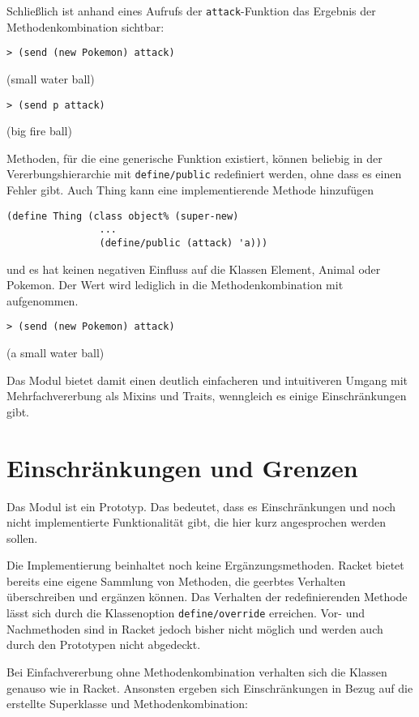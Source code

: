 Schließlich ist anhand eines Aufrufs der \texttt{attack}-Funktion das Ergebnis der Methodenkombination sichtbar:

\begin{lstlisting}
> (send (new Pokemon) attack)
\end{lstlisting}
{\rsymbol (small water ball)}

\begin{lstlisting}
> (send p attack)
\end{lstlisting}
{\rsymbol (big fire ball)}

Methoden, für die eine generische Funktion existiert, können beliebig in der Vererbungshierarchie mit \texttt{define/public} redefiniert werden, ohne dass es einen Fehler gibt. Auch Thing kann eine implementierende Methode hinzufügen

\begin{lstlisting}
(define Thing (class object% (super-new)
                ...
                (define/public (attack) 'a)))
\end{lstlisting}

und es hat keinen negativen Einfluss auf die Klassen Element, Animal oder Pokemon. Der Wert wird lediglich in die Methodenkombination mit aufgenommen.

\begin{lstlisting}
> (send (new Pokemon) attack)
\end{lstlisting}
{\rsymbol (a small water ball)}

Das Modul bietet damit einen deutlich einfacheren und intuitiveren Umgang mit Mehrfachvererbung als Mixins und Traits, wenngleich es einige Einschränkungen gibt.

\section{Einschränkungen und Grenzen}
Das Modul ist ein Prototyp. Das bedeutet, dass es  Einschränkungen und noch nicht implementierte Funktionalität gibt, die hier kurz angesprochen werden sollen.

Die Implementierung beinhaltet noch keine Ergänzungsmethoden. Racket bietet bereits eine eigene Sammlung von Methoden, die geerbtes Verhalten überschreiben und ergänzen können. Das Verhalten der redefinierenden Methode lässt sich durch die Klassenoption \texttt{define/override} erreichen. Vor- und Nachmethoden sind in Racket jedoch bisher nicht möglich und werden auch durch den Prototypen nicht abgedeckt.

Bei Einfachvererbung ohne Methodenkombination verhalten sich die Klassen genauso wie in Racket. Ansonsten ergeben sich Einschränkungen in Bezug auf die erstellte Superklasse und Methodenkombination:

